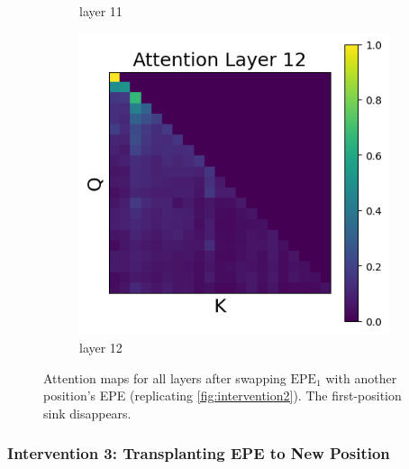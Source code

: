 \documentclass[11pt]{article}
\begin{document}
\begin{figure}[t]
\begin{subfigure}[t]{0.24\textwidth}
    \caption{layer 11}
  \end{subfigure}\hfill
  \begin{subfigure}[t]{0.24\textwidth}
    \centering
    \includegraphics[width=1.4\columnwidth]{figures/intervention2/layer_12.png}
    \caption{layer 12}
  \end{subfigure}\hfill

  \caption{Attention maps for all layers after swapping $\mathrm{EPE}_1$ with another position’s EPE (replicating \cref{fig:intervention2}). The first-position sink disappears.}
\end{figure}

\subsubsection{Intervention 3: Transplanting EPE to New Position}\label{app:intervention3}
\end{document}
